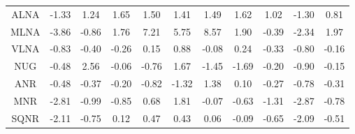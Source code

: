 \begin{longtable}{ | c || c | c | c | c | c | c | c | c | c || c |}
ALNA &  \cellcolor[HTML]{FFDFDF} -1.33 &  \cellcolor[HTML]{DFDFFF} 1.24 &  \cellcolor[HTML]{D7D7FF} 1.65 &  \cellcolor[HTML]{D7D7FF} 1.50 &  \cellcolor[HTML]{DFDFFF} 1.41 &  \cellcolor[HTML]{D7D7FF} 1.49 &  \cellcolor[HTML]{D7D7FF} 1.62 &  \cellcolor[HTML]{E7E7FF} 1.02 &  \cellcolor[HTML]{FFDFDF} -1.30 &  \cellcolor[HTML]{E7E7FF} 0.81 \\
MLNA &  \cellcolor[HTML]{FF9F9F} -3.86 &  \cellcolor[HTML]{FFE7E7} -0.86 &  \cellcolor[HTML]{CFCFFF} 1.76 &  \cellcolor[HTML]{4848FF} 7.21 &  \cellcolor[HTML]{7070FF} 5.75 &  \cellcolor[HTML]{2828FF} 8.57 &  \cellcolor[HTML]{CFCFFF} 1.90 &  \cellcolor[HTML]{FFF7F7} -0.39 &  \cellcolor[HTML]{FFC7C7} -2.34 &  \cellcolor[HTML]{CFCFFF} 1.97 \\
VLNA &  \cellcolor[HTML]{FFE7E7} -0.83 &  \cellcolor[HTML]{FFF7F7} -0.40 &  \cellcolor[HTML]{FFF7F7} -0.26 &  \cellcolor[HTML]{FFFFFF} 0.15 &  \cellcolor[HTML]{E7E7FF} 0.88 &  \cellcolor[HTML]{FFFFFF} -0.08 &  \cellcolor[HTML]{F7F7FF} 0.24 &  \cellcolor[HTML]{FFF7F7} -0.33 &  \cellcolor[HTML]{FFE7E7} -0.80 &  \cellcolor[HTML]{FFF7F7} -0.16 \\
NUG &  \cellcolor[HTML]{FFEFEF} -0.48 &  \cellcolor[HTML]{BFBFFF} 2.56 &  \cellcolor[HTML]{FFFFFF} -0.06 &  \cellcolor[HTML]{FFEFEF} -0.76 &  \cellcolor[HTML]{D7D7FF} 1.67 &  \cellcolor[HTML]{FFD7D7} -1.45 &  \cellcolor[HTML]{FFD7D7} -1.69 &  \cellcolor[HTML]{FFF7F7} -0.20 &  \cellcolor[HTML]{FFE7E7} -0.90 &  \cellcolor[HTML]{FFFFFF} -0.15 \\
ANR &  \cellcolor[HTML]{FFEFEF} -0.48 &  \cellcolor[HTML]{FFF7F7} -0.37 &  \cellcolor[HTML]{FFF7F7} -0.20 &  \cellcolor[HTML]{FFE7E7} -0.82 &  \cellcolor[HTML]{FFDFDF} -1.32 &  \cellcolor[HTML]{DFDFFF} 1.38 &  \cellcolor[HTML]{FFFFFF} 0.10 &  \cellcolor[HTML]{FFF7F7} -0.27 &  \cellcolor[HTML]{FFEFEF} -0.78 &  \cellcolor[HTML]{FFF7F7} -0.31 \\
MNR &  \cellcolor[HTML]{FFB7B7} -2.81 &  \cellcolor[HTML]{FFE7E7} -0.99 &  \cellcolor[HTML]{FFE7E7} -0.85 &  \cellcolor[HTML]{EFEFFF} 0.68 &  \cellcolor[HTML]{CFCFFF} 1.81 &  \cellcolor[HTML]{FFFFFF} -0.07 &  \cellcolor[HTML]{FFEFEF} -0.63 &  \cellcolor[HTML]{FFDFDF} -1.31 &  \cellcolor[HTML]{FFB7B7} -2.87 &  \cellcolor[HTML]{FFEFEF} -0.78 \\
SQNR &  \cellcolor[HTML]{FFC7C7} -2.11 &  \cellcolor[HTML]{FFEFEF} -0.75 &  \cellcolor[HTML]{FFFFFF} 0.12 &  \cellcolor[HTML]{F7F7FF} 0.47 &  \cellcolor[HTML]{F7F7FF} 0.43 &  \cellcolor[HTML]{FFFFFF} 0.06 &  \cellcolor[HTML]{FFFFFF} -0.09 &  \cellcolor[HTML]{FFEFEF} -0.65 &  \cellcolor[HTML]{FFC7C7} -2.09 &  \cellcolor[HTML]{FFEFEF} -0.51 \\

\end{longtable}
